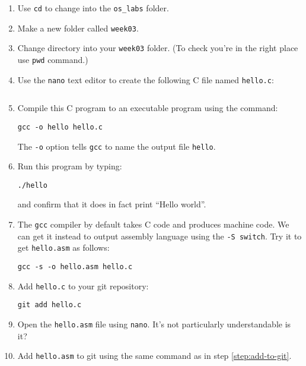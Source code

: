 \begin{enumerate}

\item
  Use \texttt{cd} to change into the \texttt{os\_labs} folder.

\item
  Make a new folder called \texttt{week03}.

\item
  Change directory into your \texttt{week03} folder.
  (To check you're in the right place use \texttt{pwd} command.)
  
\item 
  Use the \texttt{nano} text editor to create the following C file named \texttt{hello.c}:\\
  \inputminted{c}{hello.c}

\item
  Compile this C program to an executable program using the command:
\begin{verbatim}
gcc -o hello hello.c
\end{verbatim}
  The \texttt{-o} option tells \texttt{gcc} to name the output file \texttt{hello}.

\item
  Run this program by typing:
\begin{verbatim}
./hello
\end{verbatim}
  and confirm that it does in fact print ``Hello world''.

\item \label{step:asm-creation}
  The \texttt{gcc} compiler by default takes C code and produces machine code.
  We can get it instead to output assembly language using the \texttt{-S switch}.
  Try it to get \texttt{hello.asm} as follows:
\begin{verbatim}
gcc -s -o hello.asm hello.c 
\end{verbatim}

\item \label{step:add-to-git}
  Add \texttt{hello.c} to your git repository:
\begin{verbatim}
git add hello.c
\end{verbatim}

\item
  Open the \texttt{hello.asm} file using \texttt{nano}.
  It's not particularly understandable is it?

\item
  Add \texttt{hello.asm} to git using the same command as in step \ref{step:add-to-git}.
  

\end{enumerate}

